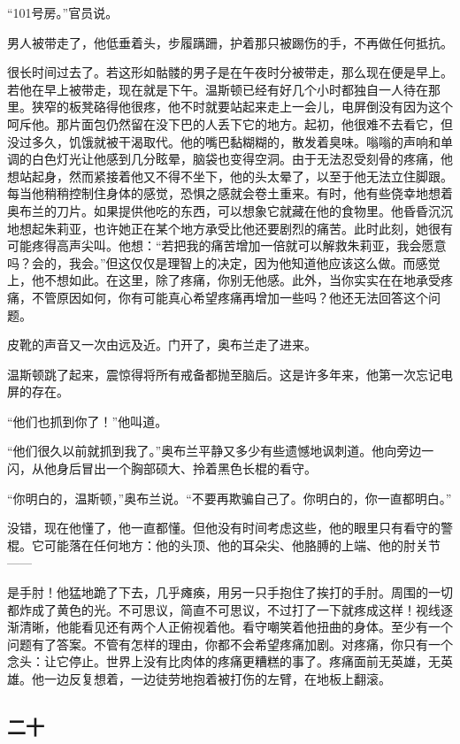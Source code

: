 ``101号房。''官员说。

男人被带走了，他低垂着头，步履蹒跚，护着那只被踢伤的手，不再做任何抵抗。

很长时间过去了。若这形如骷髅的男子是在午夜时分被带走，那么现在便是早上。若他在早上被带走，现在就是下午。温斯顿已经有好几个小时都独自一人待在那里。狭窄的板凳硌得他很疼，他不时就要站起来走上一会儿，电屏倒没有因为这个呵斥他。那片面包仍然留在没下巴的人丢下它的地方。起初，他很难不去看它，但没过多久，饥饿就被干渴取代。他的嘴巴黏糊糊的，散发着臭味。嗡嗡的声响和单调的白色灯光让他感到几分眩晕，脑袋也变得空洞。由于无法忍受刻骨的疼痛，他想站起身，然而紧接着他又不得不坐下，他的头太晕了，以至于他无法立住脚跟。每当他稍稍控制住身体的感觉，恐惧之感就会卷土重来。有时，他有些侥幸地想着奥布兰的刀片。如果提供他吃的东西，可以想象它就藏在他的食物里。他昏昏沉沉地想起朱莉亚，也许她正在某个地方承受比他还要剧烈的痛苦。此时此刻，她很有可能疼得高声尖叫。他想：``若把我的痛苦增加一倍就可以解救朱莉亚，我会愿意吗？会的，我会。''但这仅仅是理智上的决定，因为他知道他应该这么做。而感觉上，他不想如此。在这里，除了疼痛，你别无他感。此外，当你实实在在地承受疼痛，不管原因如何，你有可能真心希望疼痛再增加一些吗？他还无法回答这个问题。

皮靴的声音又一次由远及近。门开了，奥布兰走了进来。

温斯顿跳了起来，震惊得将所有戒备都抛至脑后。这是许多年来，他第一次忘记电屏的存在。

``他们也抓到你了！''他叫道。

``他们很久以前就抓到我了。''奥布兰平静又多少有些遗憾地讽刺道。他向旁边一闪，从他身后冒出一个胸部硕大、拎着黑色长棍的看守。

``你明白的，温斯顿，''奥布兰说。``不要再欺骗自己了。你明白的，你一直都明白。''

没错，现在他懂了，他一直都懂。但他没有时间考虑这些，他的眼里只有看守的警棍。它可能落在任何地方：他的头顶、他的耳朵尖、他胳膊的上端、他的肘关节------

是手肘！他猛地跪了下去，几乎瘫痪，用另一只手抱住了挨打的手肘。周围的一切都炸成了黄色的光。不可思议，简直不可思议，不过打了一下就疼成这样！视线逐渐清晰，他能看见还有两个人正俯视着他。看守嘲笑着他扭曲的身体。至少有一个问题有了答案。不管有怎样的理由，你都不会希望疼痛加剧。对疼痛，你只有一个念头：让它停止。世界上没有比肉体的疼痛更糟糕的事了。疼痛面前无英雄，无英雄。他一边反复想着，一边徒劳地抱着被打伤的左臂，在地板上翻滚。

\subsection{二十}\label{ux4e8cux5341}

